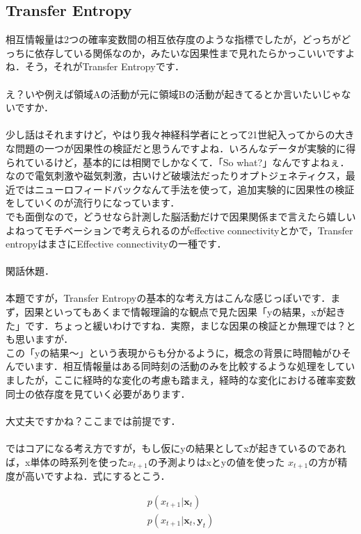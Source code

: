 \documentclass[11pt,a4paper]{jsarticle}                    %
\begin{document}
\subsection{Transfer Entropy}
相互情報量は2つの確率変数間の相互依存度のような指標でしたが，どっちがどっちに依存している関係なのか，みたいな因果性まで見れたらかっこいいですよね．そう，それがTransfer Entropyです．\\
\\
え？いや例えば領域Aの活動が元に領域Bの活動が起きてるとか言いたいじゃないですか．\\
\\
少し話はそれますけど，やはり我々神経科学者にとって21世紀入ってからの大きな問題の一つが因果性の検証だと思うんですよね．いろんなデータが実験的に得られているけど，基本的には相関でしかなくて．「So what?」なんですよねぇ．なので電気刺激や磁気刺激，古いけど破壊法だったりオプトジェネティクス，最近ではニューロフィードバックなんて手法を使って，追加実験的に因果性の検証をしていくのが流行りになっています．\\
でも面倒なので，どうせなら計測した脳活動だけで因果関係まで言えたら嬉しいよねってモチベーションで考えられるのがeffective connectivityとかで，Transfer entropyはまさにEffective connectivityの一種です．\\
\\
閑話休題．\\
\\
本題ですが，Transfer Entropyの基本的な考え方はこんな感じっぽいです．まず，因果といってもあくまで情報理論的な観点で見た因果「yの結果，xが起きた」です．ちょっと緩いわけですね．実際，まじな因果の検証とか無理では？とも思いますが．\\
この「yの結果～」という表現からも分かるように，概念の背景に時間軸がひそんでいます．相互情報量はある同時刻の活動のみを比較するような処理をしていましたが，ここに経時的な変化の考慮も踏まえ，経時的な変化における確率変数同士の依存度を見ていく必要があります．\\
\\
大丈夫ですかね？ここまでは前提です．\\
\\
ではコアになる考え方ですが，もし仮にyの結果としてxが起きているのであれば，x単体の時系列を使った$x_{t+1}$の予測よりはxとyの値を使った $x_{t+1}$の方が精度が高いですよね．式にするとこう．

\begin{eqnarray}
\label{eq:TL1}
  p(x_{t+1}| \mathbf{x}_t) \nonumber \\
  p(x_{t+1}| \mathbf{x}_t, \mathbf{y}_t) \nonumber
\end{eqnarray}
\end{document}
